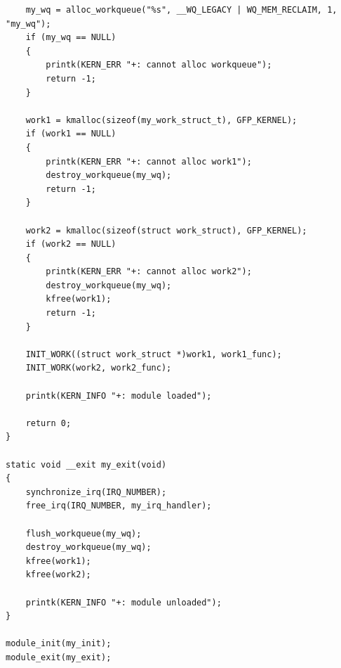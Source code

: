 \begin{lstlisting}
    my_wq = alloc_workqueue("%s", __WQ_LEGACY | WQ_MEM_RECLAIM, 1, "my_wq");
    if (my_wq == NULL)
    {
        printk(KERN_ERR "+: cannot alloc workqueue");
        return -1;
    }

    work1 = kmalloc(sizeof(my_work_struct_t), GFP_KERNEL);
    if (work1 == NULL)
    {
        printk(KERN_ERR "+: cannot alloc work1");
        destroy_workqueue(my_wq);
        return -1;
    }

    work2 = kmalloc(sizeof(struct work_struct), GFP_KERNEL);
    if (work2 == NULL)
    {
        printk(KERN_ERR "+: cannot alloc work2");
        destroy_workqueue(my_wq);
        kfree(work1);
        return -1;
    }

    INIT_WORK((struct work_struct *)work1, work1_func);
    INIT_WORK(work2, work2_func);
    
    printk(KERN_INFO "+: module loaded");

    return 0;
}

static void __exit my_exit(void)
{
    synchronize_irq(IRQ_NUMBER);
    free_irq(IRQ_NUMBER, my_irq_handler);

    flush_workqueue(my_wq);
    destroy_workqueue(my_wq);
    kfree(work1);
    kfree(work2);
    
    printk(KERN_INFO "+: module unloaded");
}

module_init(my_init);
module_exit(my_exit);

\end{lstlisting}


